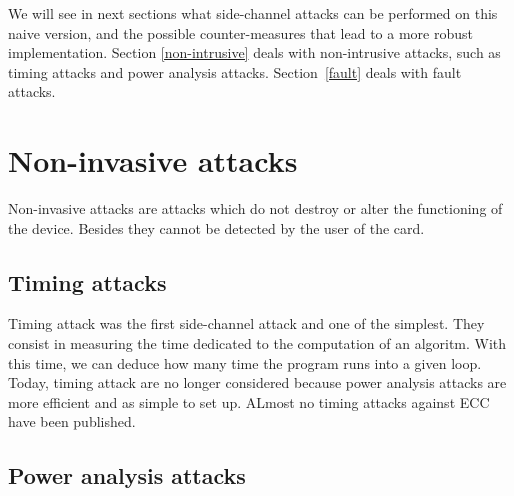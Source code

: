 \documentclass[journal]{IEEEtran}
\begin{document}
%    
%
%
%
%    
%
%    


We will see in next sections what side-channel attacks can be performed on this naive version, 
and the possible counter-measures that lead to a more robust implementation. Section \ref{non-intrusive}
deals with non-intrusive attacks, such as timing attacks and power analysis attacks. Section~\ref{fault}
deals with fault attacks.



\section{Non-invasive attacks}

Non-invasive attacks are attacks which do not destroy or alter the functioning of the device. Besides they cannot be detected by the user of the card. 
 
\label{non-invasive}    
    \subsection{Timing attacks}

Timing attack was the first side-channel attack and one of the simplest. They consist in measuring the time dedicated to the computation of an algoritm. With this time, we can deduce how many time the program runs into a given loop. \\

Today, timing attack are no longer considered because power analysis attacks are more efficient and as simple to set up. ALmost no timing attacks against ECC have been published.

    \subsection{Power analysis attacks}
\end{document}
